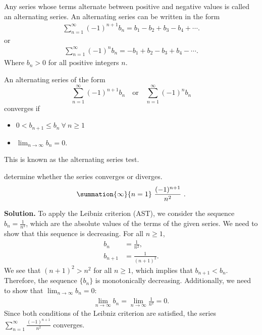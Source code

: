 \documentclass{report}
\begin{document}
   \bigbreak \noindent 
   \begin{definition}
      Any series whose terms alternate between positive and negative values is called an alternating series. An alternating series can be written in the form 
      \begin{align*}
          \sum_{n=1}^{\infty} (-1)^{n+1} b_n = b_1 - b_2 + b_3 - b_4 + \cdots
      .\end{align*}
      or
      \begin{align*}
          \sum_{n=1}^{\infty} (-1)^n b_n = -b_1 + b_2 - b_3 + b_4 - \cdots
      .\end{align*}
      Where  $b_n > 0$  for all positive integers $n$.

   \end{definition}
   \bigbreak \noindent 
   \begin{thrm}
       An alternating series of the form
        \[
        \sum_{n=1}^{\infty} (-1)^{n+1} b_n \quad \text{or} \quad \sum_{n=1}^{\infty} (-1)^n b_n
        \]
        converges if
        \begin{itemize}
            
            \item $0 < b_{n+1} \leq b_n\ \forall\ n \geq 1$
            \item $\lim_{n \to \infty} b_n = 0.$
    \end{itemize}

    This is known as the alternating series test.
   \end{thrm}

   \pagebreak \bigbreak \noindent 
   \begin{eg}
      determine whether the series converges or diverges. 
      \begin{align*}
          \summation{\infty}{n=1}\ \frac{(-1)^{n+1}}{n^{2}}\ 
      .\end{align*}
   \end{eg}
   \bigbreak \noindent 
    \textbf{Solution.} To apply the Leibniz criterion (AST), we consider the sequence \( b_n = \frac{1}{n^2} \), which are the absolute values of the terms of the given series. We need to show that this sequence is decreasing. For all \( n \geq 1 \),
    \begin{align*}
    b_{n} &= \frac{1}{n^2}, \\
    b_{n+1} &= \frac{1}{(n+1)^2}.
    \end{align*}
    We see that \( (n+1)^2 > n^2 \) for all \( n \geq 1 \), which implies that \( b_{n+1} < b_n \). Therefore, the sequence \( \{b_n\} \) is monotonically decreasing.
    \bigbreak \noindent 
    Additionally, we need to show that \( \lim_{n \to \infty} b_n = 0 \):
    \begin{align*}
        \lim_{n \to \infty} b_n = \lim_{n \to \infty} \frac{1}{n^2} = 0.
    \end{align*}
    Since both conditions of the Leibniz criterion are satisfied, the series \( \sum_{n=1}^{\infty} \frac{(-1)^{n+1}}{n^{2}} \) converges.
\end{document}
